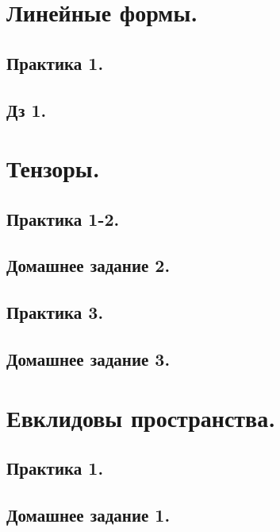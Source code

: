 \maketitle
\tableofcontents

\newpage
\section{Линейные формы.}
\subsection{Практика 1.}

\newpage
\subsection{Дз 1.}

\newpage
\section{Тензоры.}
\subsection{Практика 1-2.}

\newpage
\subsection{Домашнее задание 2.}

\newpage
\subsection{Практика 3.}

\newpage
\subsection{Домашнее задание 3.}

\newpage
\section{Евклидовы пространства.}
\subsection{Практика 1.}

\newpage
\subsection{Домашнее задание 1.}

\newpage
